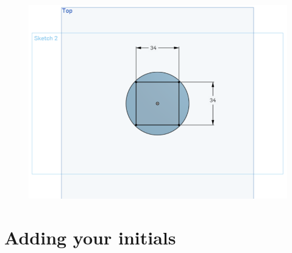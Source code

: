 \documentclass[12pt]{../manual}
\begin{document}
\begin{enumerate}
\begin{figure}[ht!]
\centering
\includegraphics[width=0.5 \textwidth]{figures/image10.png}
\end{figure}
\end{enumerate}

\section{Adding your initials}
\end{document}
